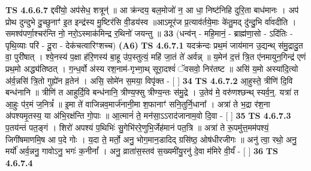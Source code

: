 \documentclass[17pt]{extarticle}
\begin{document}
                                \textbf{ TS 4.6.6.7} \newline
                  द्दवी॑यो॒ अप॑सेध॒ शत्रून्॑ ॥ आ क्र॑न्दय॒ बल॒मोजो॑ न॒ आ धा॒ निष्ट॑निहि दुरि॒ता बाध॑मानः । अप॑ प्रोथ दुन्दुभे दु॒च्छुनाꣳ॑ इ॒त इन्द्र॑स्य मु॒ष्टिर॑सि वी॒डय॑स्व ॥आऽमूर॑ज प्र॒त्याव॑र्तये॒माः के॑तु॒मद् दु॑न्दु॒भि र्वा॑वदीति । समश्व॑पर्णा॒श्चर॑न्ति नो॒ नरो॒ऽस्माक॑मिन्द्र र॒थिनो॑ जयन्तु ॥ \textbf{  33} \newline
                  \newline
                      (धन्व॑न् - महि॒मानं॒ - ब्राह्म॑णा॒सो - ऽदि॑तिः - पृथि॒व्याः परि॑ - दू॒रा - देक॑चत्वारिꣳशच्च)  \textbf{(A6)} \newline \newline
                                        \textbf{ TS 4.6.7.1} \newline
                  यदक्र॑न्दः प्रथ॒मं जाय॑मान उ॒द्यन्थ् स॑मु॒द्रादु॒त वा॒ पुरी॑षात् । श्ये॒नस्य॑ प॒क्षा ह॑रि॒णस्य॑ बा॒हू उ॑प॒स्तुत्यं॒ महि॑ जा॒तं ते॑ अर्वन्न् ॥ य॒मेन॑ द॒त्तं त्रि॒त ए॑नमायुन॒गिन्द्र॑ एणं प्रथ॒मो अद्ध्य॑तिष्ठत् । ग॒न्ध॒र्वो अ॑स्य रश॒नाम॑-गृभ्णा॒थ् सूरा॒दश्वं॑ ॅवसवो॒ निर॑तष्ट ॥ असि॑ य॒मो अस्या॑दि॒त्यो अ॑र्व॒न्नसि॑ त्रि॒तो गुह्ये॑न व्र॒तेन॑ । असि॒ सोमे॑न स॒मया॒ विपृ॑क्त - [  ] \textbf{  34} \newline
                  \newline
                                \textbf{ TS 4.6.7.2} \newline
                  आ॒हुस्ते॒ त्रीणि॑ दि॒वि बन्ध॑नानि ॥ त्रीणि॑ त आहुर्दि॒वि बन्ध॑नानि॒ त्रीण्य॒फ्सु त्रीण्य॒न्तः स॑मु॒द्रे । उ॒तेव॑ मे॒ वरु॑णश्छन्थ् स्यर्व॒न्॒. यत्रा॑ त आ॒हुः प॑र॒मं ज॒नित्रं᳚ ॥ इ॒मा ते॑ वाजिन्नव॒मार्ज॑नानी॒मा श॒फानाꣳ॑ सनि॒तुर्नि॒धाना᳚ । अत्रा॑ ते भ॒द्रा र॑श॒ना अ॑पश्यमृ॒तस्य॒ या अ॑भि॒रक्ष॑न्ति गो॒पाः ॥ आ॒त्मानं॑ ते॒ मन॑सा॒ऽऽराद॑जानाम॒वो दि॒वा - [  ] \textbf{  35} \newline
                  \newline
                                \textbf{ TS 4.6.7.3} \newline
                  प॒तय॑न्तं पत॒ङ्गं । शिरो॑ अपश्यं प॒थिभिः॑ सु॒गेभि॑ररे॒णुभि॒र्जेह॑मानं पत॒त्रि ॥ अत्रा॑ ते रू॒पमु॑त्त॒मम॑पश्यं॒ जिगी॑षमाणमि॒ष आ प॒दे गोः । य॒दा ते॒ मर्तो॒ अनु॒ भोग॒मान॒डादिद् ग्रसि॑ष्ठ॒ ओष॑धीरजीगः ॥ अनु॑ त्वा॒ रथो॒ अनु॒ मर्यो॑ अर्व॒न्ननु॒ गावोऽनु॒ भगः॑ क॒नीनां᳚ । अनु॒ व्राता॑स॒स्तव॑ स॒ख्यमी॑यु॒रनु॑ दे॒वा म॑मिरे वी॒र्यं॑ - [  ] \textbf{  36} \newline
                  \newline
                                \textbf{ TS 4.6.7.4} \newline
\end{document}
